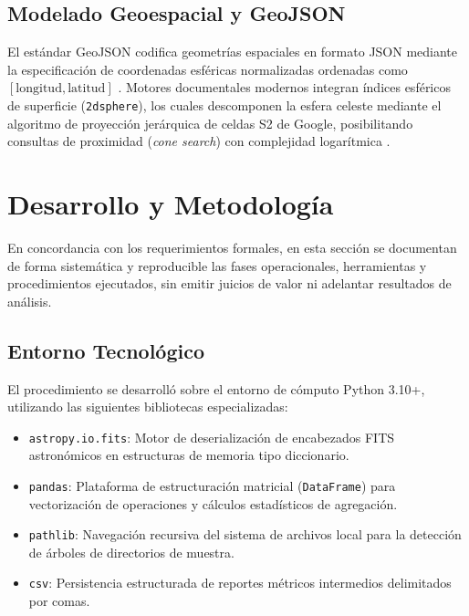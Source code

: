 \documentclass[10pt]{article}
\begin{document}
\subsection{Modelado Geoespacial y GeoJSON}
El estándar GeoJSON codifica geometrías espaciales en formato JSON mediante la especificación de coordenadas esféricas normalizadas ordenadas como $[\text{longitud}, \text{latitud}]$ \cite{butler2016geojson}. Motores documentales modernos integran índices esféricos de superficie (\texttt{2dsphere}), los cuales descomponen la esfera celeste mediante el algoritmo de proyección jerárquica de celdas S2 de Google, posibilitando consultas de proximidad (\textit{cone search}) con complejidad logarítmica \cite{mongodb_geo}.

\section{Desarrollo y Metodología}\label{sec:metodologia}

En concordancia con los requerimientos formales, en esta sección se documentan de forma sistemática y reproducible las fases operacionales, herramientas y procedimientos ejecutados, sin emitir juicios de valor ni adelantar resultados de análisis.

\subsection{Entorno Tecnológico}
El procedimiento se desarrolló sobre el entorno de cómputo Python 3.10+, utilizando las siguientes bibliotecas especializadas:
\begin{itemize}
    \item \texttt{astropy.io.fits}: Motor de deserialización de encabezados FITS astronómicos en estructuras de memoria tipo diccionario.
    \item \texttt{pandas}: Plataforma de estructuración matricial (\texttt{DataFrame}) para vectorización de operaciones y cálculos estadísticos de agregación.
    \item \texttt{pathlib}: Navegación recursiva del sistema de archivos local para la detección de árboles de directorios de muestra.
    \item \texttt{csv}: Persistencia estructurada de reportes métricos intermedios delimitados por comas.
\end{itemize}
\end{document}
